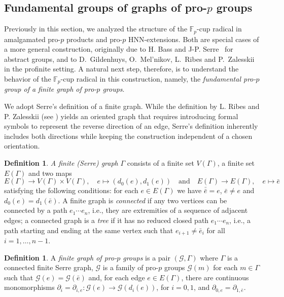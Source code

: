 \documentclass{amsart}
\theoremstyle{definition}
\newtheorem{defn}[thm]{Definition}
\theoremstyle{remark}
\newcommand{\HNN}{{\rm HNN}}
\newcommand{\FF}{\mathbb{F}}
\newcommand{\calG}{\mathcal{G}}
\begin{document}
\subsection{Fundamental groups of graphs of pro-$p$ groups}
\label{ssec:Fundamental Groups}

Previously in this section, we analyzed the structure of the $\FF_p$-cup radical in amalgamated pro-$p$ products and pro-$p$ \HNN-extensions. Both are special cases of a more general construction, originally due to H. Bass and J-P. Serre~\cite{Serre2003} for abstract groups, and to D.~Gildenhuys, O.~Mel'nikov, L.~Ribes and P.~Zalesskii \cite[\S 6.7]{Rib17} in the profinite setting. A natural next step, therefore, is to understand the behavior of the $\FF_p$-cup radical in this construction, namely, the {\it fundamental pro-$p$ group of a finite graph of pro-$p$ groups}.

We adopt Serre's definition of a finite graph. While the definition by L. Ribes and P. Zalesskii (see \cite{SSS12}) yields an oriented graph that requires introducing formal symbols to represent the reverse direction of an edge, Serre's definition inherently includes both directions while keeping the construction independent of a chosen orientation.

\begin{defn}
{\it A finite (Serre) graph} $\Gamma$ consists of a finite set $V(\Gamma)$, a finite set $E(\Gamma)$ and two maps
$$E(\Gamma) \to V(\Gamma) \times V(\Gamma), \quad e \mapsto (d_0(e), d_1(e))\quad 
\text{and}\quad 
E(\Gamma) \to E(\Gamma), \quad e \mapsto \bar{e}$$
satisfying the following conditions: for each $e \in E(\Gamma)$ we have $\bar{\bar{e}} = e$, $\bar{e} \neq e$ and $d_0(e) = d_1(\bar{e})$. A finite graph is {\it connected} if any two vertices can be connected by a path $e_1\cdots e_n$, i.e., they are extremities of a sequence of adjacent edges; a connected graph is a {\it tree} if it has no reduced closed path $e_1\cdots e_n$, i.e., a path starting and ending at the same vertex such that $e_{i+1} \neq \bar{e}_i$ for all $i=1,\dots,n-1$. 
\end{defn}

\begin{defn}
A {\it finite graph of pro-$p$ groups} is a pair $(\calG,\Gamma)$ where $\Gamma$ is a connected finite Serre graph, $\calG$ is a family of pro-$p$ groups $\calG(m)$ for each $m \in \Gamma$ such that $\calG(e) = \calG(\bar{e})$ and, for each edge $e \in E(\Gamma)$, there are continuous monomorphisms $\partial_i = \partial_{i,e}: \calG(e) \to \calG(d_i(e))$, for $i=0,1$, and $\partial_{0,e} = \partial_{1,\bar{e}}$.
\end{defn}
\end{document}
